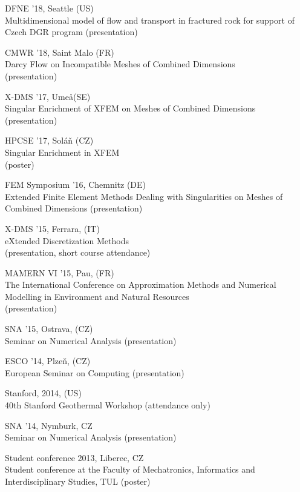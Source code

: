 \documentclass[bibliography=totocnumbered,dvipsnames,FM,Dis, EN]{tulthesis_autoreferat}
\begin{document}
\begin{itemize}[label={}, leftmargin=*]
{\small
\item DFNE '18, Seattle (US) \\ Multidimensional model of flow and transport in fractured
rock for support of Czech DGR program (presentation)
\item CMWR '18, Saint Malo (FR) \\ Darcy Flow on Incompatible Meshes of
Combined Dimensions \\ (presentation)
\item X-DMS '17, Ume\aa (SE) \\ Singular Enrichment of XFEM on Meshes of
Combined Dimensions \\ (presentation)
\item HPCSE '17, Sol\'a{\v n} (CZ) \\ Singular Enrichment in XFEM \\ (poster)
\item FEM Symposium '16, Chemnitz (DE) \\ Extended Finite Element Methods Dealing with Singularities on Meshes of Combined Dimensions (presentation)
\item X-DMS '15, Ferrara, (IT) \\ eXtended Discretization Methods \\ (presentation, short course attendance)
\item MAMERN VI '15, Pau, (FR) \\ The International Conference on Approximation Methods and Numerical Modelling in Environment and Natural Resources \\ (presentation)
\item SNA '15, Ostrava, (CZ) \\ Seminar on Numerical Analysis (presentation)
\item ESCO '14, Plze{\v n}, (CZ) \\ European Seminar on Computing (presentation)
\item Stanford, 2014, (US) \\ 40th Stanford Geothermal Workshop (attendance only)
\item SNA '14, Nymburk, CZ \\ Seminar on Numerical Analysis (presentation)
\item Student conference 2013, Liberec, CZ \\ Student conference at the Faculty of Mechatronics, Informatics and Interdisciplinary Studies, TUL (poster)
}
\end{itemize}




{\small

% 

}
\end{document}
